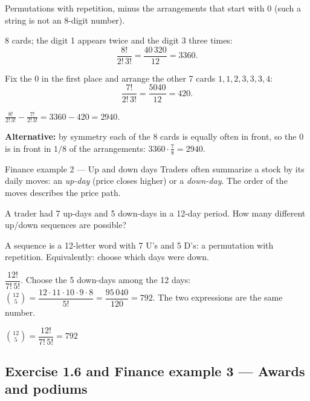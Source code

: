 \ifsolutions
	\soltitle
	\idea Permutations with repetition, minus the arrangements that start with
	$0$ (such a string is not an 8-digit number).

	 8 cards; the digit 1 appears twice and the
	digit 3 three times:
	\[ \frac{8!}{2!\,3!} = \frac{40\,320}{12} = 3360. \]

	 Fix the $0$ in the first place and arrange
	the other 7 cards $1,1,2,3,3,3,4$:
	\[ \frac{7!}{2!\,3!} = \frac{5040}{12} = 420. \]

	\begin{answer}
		$\displaystyle\frac{8!}{2!\,3!}-\frac{7!}{2!\,3!} = 3360-420 = 2940.$
	\end{answer}

	\begin{remark}
		\textbf{Alternative:} by symmetry each of the 8 cards is equally often in
		front, so the $0$ is in front in $1/8$ of the arrangements:
		$3360\cdot\frac78 = 2940$.
	\end{remark}
\fi

\begin{fin}{Finance example 2 --- Up and down days}
	\context Traders often summarize a stock by its daily moves: an
	\emph{up-day} (price closes higher) or a \emph{down-day}. The order of the
	moves describes the price path.

	A trader had 7 up-days and 5 down-days in a 12-day period. How many
	different up/down sequences are possible?
\end{fin}
\workspace{2cm}

\ifsolutions
	\soltitle
	\idea A sequence is a 12-letter word with 7 U's and 5 D's: a permutation
	with repetition. Equivalently: choose which days were down.

	 $\dfrac{12!}{7!\,5!}$.
	 Choose the 5 down-days among the 12 days:
	$\binom{12}{5}=\dfrac{12\cdot11\cdot10\cdot9\cdot8}{5!}=\dfrac{95\,040}{120}=792$.
	The two expressions are the same number.
	\begin{answer}
		$\binom{12}{5}=\dfrac{12!}{7!\,5!}=792$
	\end{answer}
\fi

\subsection{Exercise 1.6 and Finance example 3 --- Awards and podiums}

